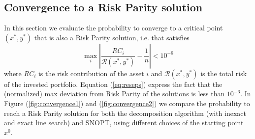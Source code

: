 \subsection{Convergence to a Risk Parity solution}
In this section we evaluate the probability to converge to a critical point $(x^*,y^*)$ that is also a Risk Parity solution, i.e. that satisfies 
\begin{equation}\label{eq:reseps}
\max_i \left| \frac{RC_i}{\mathcal{R}(x^*,y^*)} - \frac{1}{n} \right| < 10^{-6}
\end{equation}
where $RC_i$ is the risk contribution of the asset $i$ and ${\mathcal{R}(x^*,y^*)}$ is the total risk of the invested portfolio. Equation (\ref{eq:reseps}) express the fact that the (normalized) max deviation from Risk Parity of the solutions is less than $10^{-6}$. In Figure (\ref{fig:convergence1}) and (\ref{fig:convergence2}) we compare the probability to reach a Risk Parity solution for both the decomposition algorithm (with inexact and exact line search) and SNOPT, using different choices of the starting point $x^0$. 

